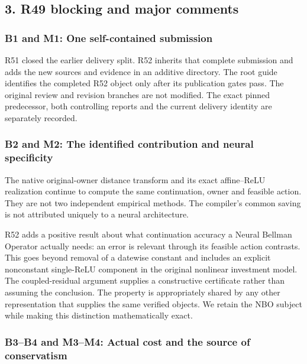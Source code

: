 \documentclass[ecta,nameyear,draft]{econsocart}
\begin{document}
\hypertarget{r49-blocking-and-major-comments}{%
\subsection{3. R49 blocking and major
comments}\label{r49-blocking-and-major-comments}}

\hypertarget{b1-and-m1-one-self-contained-submission}{%
\subsubsection{B1 and M1: One self-contained
submission}\label{b1-and-m1-one-self-contained-submission}}

R51 closed the earlier delivery split. R52 inherits that complete
submission and adds the new sources and evidence in an additive
directory. The root guide identifies the completed R52 object only after
its publication gates pass. The original review and revision branches
are not modified. The exact pinned predecessor, both controlling reports
and the current delivery identity are separately recorded.

\hypertarget{b2-and-m2-the-identified-contribution-and-neural-specificity}{%
\subsubsection{B2 and M2: The identified contribution and neural
specificity}\label{b2-and-m2-the-identified-contribution-and-neural-specificity}}

The native original-owner distance transform and its exact affine--ReLU
realization continue to compute the same continuation, owner and
feasible action. They are not two independent empirical methods. The
compiler's common saving is not attributed uniquely to a neural
architecture.

R52 adds a positive result about what continuation accuracy a Neural
Bellman Operator actually needs: an error is relevant through its
feasible action contrasts. This goes beyond removal of a datewise
constant and includes an explicit nonconstant single-ReLU component in
the original nonlinear investment model. The coupled-residual argument
supplies a constructive certificate rather than assuming the conclusion.
The property is appropriately shared by any other representation that
supplies the same verified objects. We retain the NBO subject while
making this distinction mathematically exact.

\hypertarget{b3b4-and-m3m4-actual-cost-and-the-source-of-conservatism}{%
\subsubsection{B3--B4 and M3--M4: Actual cost and the source of
conservatism}\label{b3b4-and-m3m4-actual-cost-and-the-source-of-conservatism}}
\end{document}
